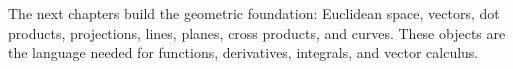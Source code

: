 The next chapters build the geometric foundation: Euclidean space, vectors, dot products, projections, lines, planes, cross products, and curves. These objects are the language needed for functions, derivatives, integrals, and vector calculus.

 


